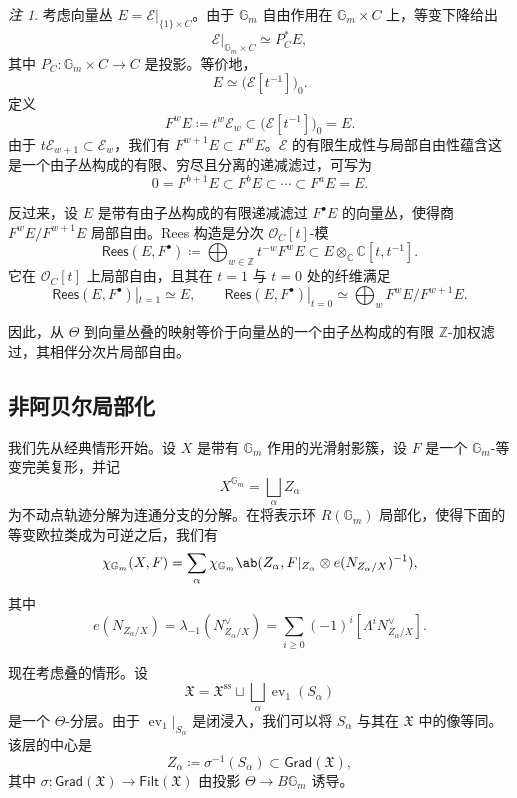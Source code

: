 \documentclass{amsart}
\theoremstyle{definition}
\theoremstyle{remark}
\newtheorem{rmk}[thm]{注}
\theoremstyle{plain}
\theoremstyle{definition}
\theoremstyle{remark}
\newcommand{\G}{\mathbb{G}}
\newcommand{\C}{\mathbb{C}}
\newcommand{\Z}{\mathbb{Z}}
\newcommand{\mc}[1]{\mathcal{#1}}
\newcommand{\mf}[1]{\mathfrak{#1}}
\newcommand{\mr}[1]{\mathrm{#1}}
\newcommand{\ms}[1]{\mathsf{#1}}
\newcommand{\1}{\mathbf{1}}
\newcommand{\2}{\mathbf{2}}
\newcommand{\3}{\mathbf{3}}
\DeclareMathOperator{\ev}{ev}
\begin{document}
\begin{rmk}
    考虑向量丛 \(E=\mc{E}|_{\{1\}\times C}\)。由于 \(\G_m\) 自由作用在 \(\G_m\times C\) 上，等变下降给出
    \[
        \mc{E}|_{\G_m\times C}\simeq P_C^*E,
    \]
    其中 \(P_C\colon\G_m\times C\to C\) 是投影。等价地，
    \[
        E\simeq\big(\mc{E}[t^{-1}]\big)_0.
    \]
    定义
    \[
        F^wE\coloneqq t^w\mc{E}_w\subset\big(\mc{E}[t^{-1}]\big)_0=E.
    \]
    由于 \(t\mc{E}_{w+1}\subset\mc{E}_w\)，我们有 \(F^{w+1}E\subset F^wE\)。\(\mc{E}\) 的有限生成性与局部自由性蕴含这是一个由子丛构成的有限、穷尽且分离的递减滤过，可写为
    \[
        0=F^{b+1}E\subset F^bE\subset\cdots\subset F^aE=E.
    \]

    反过来，设 \(E\) 是带有由子丛构成的有限递减滤过 \(F^\bullet E\) 的向量丛，使得商 \(F^wE/F^{w+1}E\) 局部自由。Rees 构造是分次 \(\mc{O}_C[t]\)-模
    \[
        \ms{Rees}(E,F^\bullet)
        \coloneqq
        \bigoplus_{w\in\Z}t^{-w}F^wE
        \subset
        E\otimes_{\C}\C[t,t^{-1}].
    \]
    它在 \(\mc{O}_C[t]\) 上局部自由，且其在 \(t=1\) 与 \(t=0\) 处的纤维满足
    \[
        \ms{Rees}(E,F^\bullet)|_{t=1}\simeq E,
        \qquad
        \ms{Rees}(E,F^\bullet)|_{t=0}
        \simeq
        \bigoplus_w F^wE/F^{w+1}E.
    \]
\end{rmk}

因此，从 \(\Theta\) 到向量丛叠的映射等价于向量丛的一个由子丛构成的有限 \(\Z\)-加权滤过，其相伴分次片局部自由。
\subsection{非阿贝尔局部化}%
\label{sub:Non-abelian localization}

我们先从经典情形开始。设 \(X\) 是带有 \(\G_m\) 作用的光滑射影簇，设 \(F\) 是一个 \(\G_m\)-等变完美复形，并记
\[
    X^{\G_m}=\bigsqcup_\alpha Z_\alpha
\]
为不动点轨迹分解为连通分支的分解。在将表示环 \(R(\G_m)\) 局部化，使得下面的等变欧拉类成为可逆之后，我们有
\[
    \chi_{\G_m}(X,F)
    =
    \sum_\alpha
    \chi_{\G_m}\ab(
        Z_\alpha,
        F|_{Z_\alpha}\otimes e(N_{Z_\alpha/X})^{-1}
    ),
\]
其中
\[
    e(N_{Z_\alpha/X})
    =
    \lambda_{-1}(N_{Z_\alpha/X}^\vee)
    =
    \sum_{i\geq0}(-1)^i[\Lambda^iN_{Z_\alpha/X}^\vee].
\]

现在考虑叠的情形。设
\[
    \mf{X}
    =
    \mf{X}^{\mr{ss}}
    \sqcup
    \bigsqcup_\alpha\ev_1(S_\alpha)
\]
是一个 \(\Theta\)-分层。由于 \(\ev_1|_{S_\alpha}\) 是闭浸入，我们可以将 \(S_\alpha\) 与其在 \(\mf{X}\) 中的像等同。该层的中心是
\[
    Z_\alpha\coloneqq\sigma^{-1}(S_\alpha)\subset\ms{Grad}(\mf{X}),
\]
其中 \(\sigma\colon\ms{Grad}(\mf{X})\to\ms{Filt}(\mf{X})\) 由投影 \(\Theta\to B\G_m\) 诱导。
\end{document}
